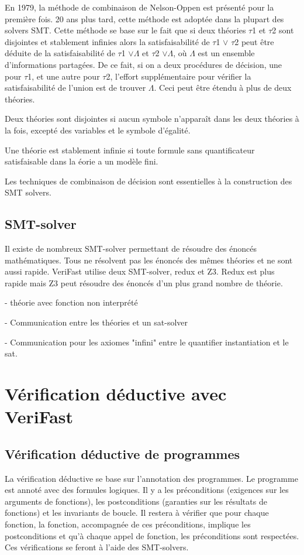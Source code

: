 \documentclass[9pt]{book}
\newcommand{\verifast}{VeriFast}
\begin{document}
 		En 1979, la m\'ethode de combinaison de Nelson-Oppen est pr\'esent\'e pour la premi\`ere fois. 20 ans plus tard, cette m\'ethode est adopt\'ee dans la plupart des solvers SMT. Cette m\'ethode se base sur le fait que si deux th\'eories $\tau$1 et $\tau$2 sont disjointes et stablement infinies alors la satisfaisabilit\'e de $\tau$1 $\lor$ $\tau$2 peut \^etre d\'eduite de la satisfaisabilit\'e de $\tau$1 $\lor \Lambda$ et $\tau$2 $\lor \Lambda$, o\`u $\Lambda$ est un ensemble d'informations partag\'ees. De ce fait, si on a deux proc\'edures de d\'ecision, une pour $\tau$1, et une autre pour $\tau$2, l'effort suppl\'ementaire pour v\'erifier la satisfaisabilit\'e de l'union est de trouver $\Lambda$. Ceci peut \^etre \'etendu \`a plus de deux th\'eories. \par
 		Deux th\'eories sont disjointes si aucun symbole n'appara\^it dans les deux th\'eories \`a la fois, except\'e des variables et le symbole d'\'egalit\'e. \par
 		Une th\'eorie est stablement infinie si toute formule sans quantificateur satisfaisable dans la \th\'eorie a un mod\`ele fini.

 		\par Les techniques de combinaison de d\'ecision sont essentielles \`a la construction des SMT solvers.

 	\section{SMT-solver}
 		Il existe de nombreux SMT-solver permettant de r\'esoudre des \'enonc\'es math\'ematiques. Tous ne r\'esolvent pas les \'enonc\'es des m\^emes th\'eories et ne sont aussi rapide. \verifast{} utilise deux SMT-solver, redux et Z3. Redux est plus rapide mais Z3 peut r\'esoudre des \'enonc\'es d'un plus grand nombre de th\'eorie.

 		- th\'eorie avec fonction non interpr\'et\'e \par
 		- Communication entre les th\'eories et un sat-solver \par
 		- Communication pour les axiomes "infini" entre le quantifier instantiation et le sat.

\chapter{V\'erification d\'eductive avec \verifast{}}
	\section{V\'erification d\'eductive de programmes}
		La v\'erification d\'eductive se base sur l'annotation des programmes. Le programme est annot\'e avec des formules logiques. Il y a les pr\'econditions (exigences sur les arguments de fonctions), les postconditions (garanties sur les r\'esultats de fonctions) et les invariants de boucle. Il restera \`a v\'erifier que pour chaque fonction, la fonction, accompagn\'ee de ces pr\'econditions, implique les postconditions et qu'\`a chaque appel de fonction, les pr\'econditions sont respect\'ees. Ces v\'erifications se feront \`a l'aide des SMT-solvers.
\end{document}
